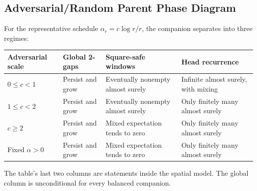 \subsection{Adversarial/Random Parent Phase Diagram}
For the representative schedule $\alpha_r= c\log r/r$, the companion separates into three regimes:
\begin{longtable}{@{}>{\raggedright\arraybackslash}p{}>{\raggedright\arraybackslash}p{}>{\raggedright\arraybackslash}p{}>{\raggedright\arraybackslash}p{}@{}}
\toprule
Adversarial scale & Global 2-gaps & Square-safe windows & Head recurrence \\
\midrule
$0\le c < 1$ & Persist and grow & Eventually nonempty almost surely & Infinite almost surely, with mixing \\
$1\le c < 2$ & Persist and grow & Eventually nonempty almost surely & Only finitely many almost surely \\
$c\ge 2$ & Persist and grow & Mixed expectation tends to zero & Only finitely many almost surely \\
Fixed $\alpha > 0$ & Persist and grow & Mixed expectation tends to zero & Only finitely many almost surely \\
\bottomrule
\end{longtable}
The table's last two columns are statements inside the spatial model. The global column is unconditional for every balanced companion.
